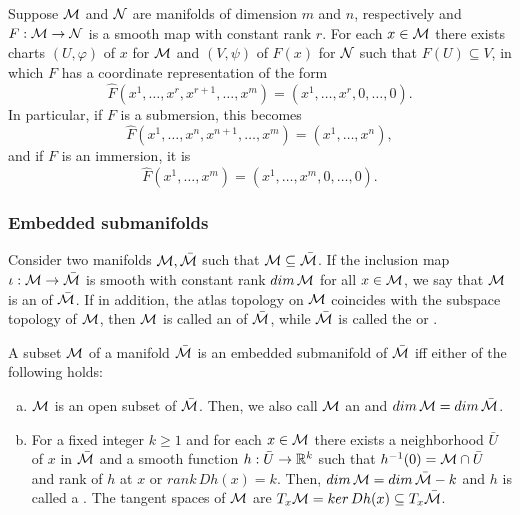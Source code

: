 \documentclass[11pt,a4paper]{article}
\begin{document}
\begin{prop}
Suppose $\mathcal{M}$ and $\mathcal{N}$ are manifolds of dimension $m$ and $n$, respectively and $F:\mathcal{M}\rightarrow \mathcal{N}$ is a smooth map with constant rank $r$. For each $x\in \mathcal{M}$ there exists charts $(U,\varphi)$ of $x$ for $\mathcal{M}$ and $(V,\psi)$ of $F(x)$ for $\mathcal{N}$ such that $F(U)\subseteq V$, in which $F$ has a coordinate representation of the form
\begin{equation*}
\hat{F}(x^1,\ldots,x^r,x^{r+1},\ldots,x^m) = (x^1,\ldots,x^r,0,\ldots,0).
\end{equation*}
In particular, if $F$ is a submersion, this becomes
\begin{equation*}
\hat{F}(x^1,\ldots,x^n,x^{n+1},\ldots,x^m) = (x^1,\ldots,x^n),
\end{equation*}
and if $F$ is an immersion, it is
\begin{equation*}
\hat{F}(x^1,\ldots,x^m) = (x^1,\ldots,x^m,0,\ldots, 0).
\end{equation*}
\end{prop}

\subsubsection{Embedded submanifolds}

\begin{mydef}
Consider two manifolds $\mathcal{M},\bar{\mathcal{M}}$ such that $\mathcal{M}\subseteq \bar{\mathcal{M}}$. If the inclusion map $\iota:\mathcal{M}\rightarrow \bar{\mathcal{M}}$ is smooth with constant rank $dim\,\mathcal{M}$ for all $x\in \mathcal{M}$, we say that $\mathcal{M}$ is an  of $\bar{\mathcal{M}}$. If in addition, the atlas topology on $\mathcal{M}$ coincides with the subspace topology of $\mathcal{M}$, then $\mathcal{M}$ is called an  of $\bar{\mathcal{M}}$, while $\bar{\mathcal{M}}$ is called the  or .
\end{mydef}

\begin{prop}
A subset $\mathcal{M}$ of a manifold $\bar{\mathcal{M}}$ is an embedded submanifold of $\bar{\mathcal{M}}$ iff either of the following holds:
\begin{enumerate}[(a)]
    \item $\mathcal{M}$ is an open subset of $\bar{\mathcal{M}}$. Then, we also call $\mathcal{M}$ an  and $dim\,\mathcal{M} = dim\,\bar{\mathcal{M}}$.
    \item For a fixed integer $k\ge 1$ and for each $x\in \mathcal{M}$ there exists a neighborhood $\bar{U}$ of $x$ in $\bar{\mathcal{M}}$ and a smooth function $h:\bar{U}\rightarrow \mathbb{R}^k$ such that $h^{-1}(0) = \mathcal{M}\cap \bar{U}$ and rank of $h$ at $x$ or $rank\,Dh(x) = k$. Then, $dim\,\mathcal{M} = dim\,\bar{\mathcal{M}} - k$ and $h$ is called a . The tangent spaces of $\mathcal{M}$ are $T_x\mathcal{M} = ker\,Dh(x)\subseteq T_x\bar{\mathcal{M}}$.
\end{enumerate}
\end{prop}
\end{document}
